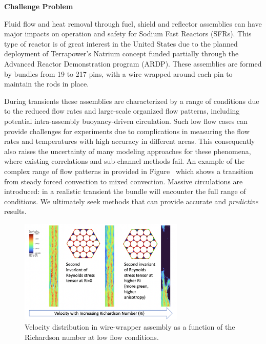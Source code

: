 \textbf{Challenge Problem}

Fluid flow and heat removal through fuel, shield and reflector assemblies  can have major impacts on operation and safety for Sodium Fast Reactors (SFRs). This type of reactor is of great interest in the United States due to the planned  deployment of Terrapower's Natrium concept funded partially through the Advanced Reactor Demonstration program (ARDP). These assemblies are formed by bundles from 19 to 217 pins, with a wire wrapped around each pin to maintain the rods in place.

During transients these assemblies are characterized by a range of conditions due to the reduced flow rates and
large-scale organized flow patterns, including potential intra-assembly buoyancy-driven circulation. Such low flow cases can provide
challenges for experiments due to complications in measuring the flow rates and temperatures with high accuracy in
different areas. This consequently also raises the uncertainty of many modeling approaches for these phenomena, where existing correlations and sub-channel methods fail. An example of the complex range of flow patterns in provided in Figure~ which shows a transition from steady forced convection to mixed convection. Massive circulations are introduced: in a realistic transient the bundle will encounter the full range of conditions. We ultimately seek methods that can provide accurate and \textit{predictive} results.

\begin{figure}[t!] \centering
    \includegraphics[width = 0.70\textwidth]{figs/challenge.png}
    \caption{ Velocity distribution in wire-wrapper assembly as a function of the Richardson number at low flow conditions. \label{fig:cha}}
\end{figure}
